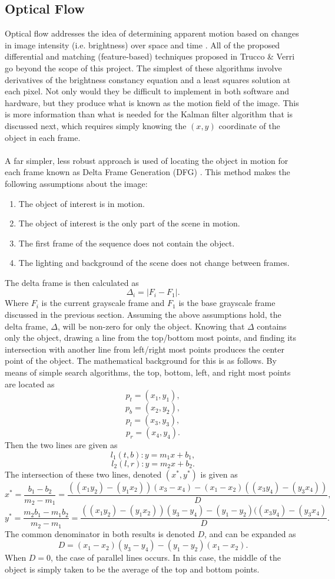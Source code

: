 \documentclass[12pt]{article} %
\begin{document}
\subsection{Optical Flow}
Optical flow addresses the idea of determining apparent motion based on changes in image intensity (i.e. brightness) over space and time \cite{4}. All of the proposed differential and matching (feature-based) techniques proposed in Trucco \& Verri \cite{4} go beyond the scope of this project. The simplest of these algorithms involve derivatives of the brightness constancy equation and a least squares solution at each pixel. Not only would they be difficult to implement in both software and hardware, but they produce what is known as the motion field of the image. This is more information than what is needed for the Kalman filter algorithm that is discussed next, which requires simply knowing the $(x,y)$ coordinate of the object in each frame. \\\\
A far simpler, less robust approach is used of locating the object in motion for each frame known as Delta Frame Generation (DFG) \cite{8}. This method makes the following assumptions about the image:
\begin{enumerate}
\item The object of interest is in motion.
\item The object of interest is the only part of the scene in motion.
\item The first frame of the sequence does not contain the object.
\item The lighting and background of the scene does not change between frames.
\end{enumerate}
The delta frame is then calculated as 
\begin{equation}
\Delta_i = | F_i - F_1 |.
\end{equation}
Where $F_i$ is the current grayscale frame and $F_1$ is the base grayscale frame discussed in the previous section. Assuming the above assumptions hold, the delta frame, $\Delta$, will be non-zero for only the object. Knowing that $\Delta$ contains only the object, drawing a line from the top/bottom most points, and finding its intersection with another line from left/right most points produces the center point of the object. The mathematical background for this is as follows. By means of simple search algorithms, the top, bottom, left, and right most points are located as
\[
p_t = (x_1, y_1) ,
\]
\[
p_b = (x_2, y_2) ,
\]
\[
p_l = (x_3, y_3) ,
\]
\[
p_r = (x_4, y_4) .
\]
Then the two lines are given as 
\[
l_1(t,b): y = m_1 x + b_1,
\]
\[
l_2(l,r): y = m_2 x + b_2.
\]
The intersection of these two lines, denoted $(x^*, y^*)$ is given as
\[
x^* = \frac{b_1 - b_2}{m_2 - m_1} = \frac{((x_1y_2) - (y_1x_2))(x_3 - x_4) - (x_1 - x_2)((x_3y_4) - (y_3x_4))}{D},
\]
\[
y^*  = \frac{m_2 b_1 - m_1 b_2}{m_2 - m_1} = \frac{((x_1y_2) - (y_1x_2))(y_3 - y_4) - (y_1 - y_2)((x_3y_4) - (y_3x_4)}{D}.
\]
The common denominator in both results is denoted $D$, and can be expanded as
\[
D = (x_1 - x_2)(y_3 - y_4) - (y_1 - y_2)(x_1 - x_2).
\]
When $D = 0$, the case of parallel lines occurs. In this case, the middle of the object is simply taken to be the average of the top and bottom points.
\end{document}
